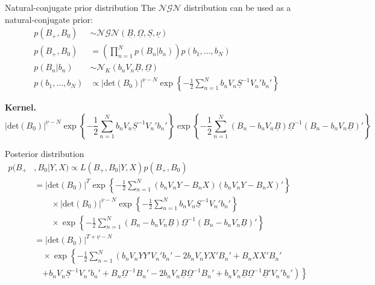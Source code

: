 \documentclass[notes,blackandwhite,mathsans,usenames,dvipsnames]{beamer}
\begin{document}
\begin{frame}{Natural-conjugate prior distribution}
\small
{\color{mcxs2}The} $\mathcal{NGN}$ {\color{mcxs2}distribution can be used as a natural-conjugate prior:}
\begin{align*}
p(B_+,B_0)&\sim\mathcal{NGN}\left( \underline{B}, \underline{\Omega}, \underline{S} , \underline{\nu}  \right)\\[2ex]
p(B_+,B_0)&= \left(\prod_{n=1}^{N}p(B_n|b_n)\right)p(b_1,\dots,b_N)\\[1ex]
p(B_n|b_n)&\sim\mathcal{N}_K\left( b_nV_n\underline{B}, \underline{\Omega} \right)\\
p(b_1,\dots,b_N)&\propto |\text{det}(B_0)|^{\underline{\nu}-N}\exp\left\{ -\frac{1}{2}\sum_{n=1}^N b_nV_n\underline{S}^{-1}V_n'b_n'\right\}
\end{align*}

\bigskip\textbf{Kernel.}\scriptsize
$$
|\text{det}(B_0)|^{\underline{\nu}-N}\exp\left\{ -\frac{1}{2}\sum_{n=1}^N b_nV_n\underline{S}^{-1}V_n'b_n'\right\}
\exp\left\{ -\frac{1}{2}\sum_{n=1}^N (B_n-b_nV_n\underline{B})\underline{\Omega}^{-1}(B_n-b_nV_n\underline{B})'\right\}
$$
\end{frame}





\begin{frame}{Posterior distribution}
\small
\begin{align*}
p(B_+&,B_0|Y,X)\propto L(B_+,B_0|Y,X)p(B_+,B_0)\\[2ex]
&= |\text{det}\left( B_0 \right)|^{T}\exp\left\{ -\frac{1}{2}\sum_{n=1}^N (b_nV_nY - B_n X)(b_nV_nY - B_n X)' \right\}\\
&\qquad\times |\text{det}(B_0)|^{\underline{\nu}-N} \exp\left\{ -\frac{1}{2}\sum_{n=1}^N b_nV_n\underline{S}^{-1}V_n'b_n'\right\}\\
&\qquad\times \exp\left\{ -\frac{1}{2}\sum_{n=1}^N (B_n-b_nV_n\underline{B})\underline{\Omega}^{-1}(B_n-b_nV_n\underline{B})'\right\}\\[2ex]
&= |\text{det}\left( B_0 \right)|^{T+\underline{\nu}-N}\\
&\quad\times\exp\left\{ -\frac{1}{2}\sum_{n=1}^N \left(
b_nV_nYY'V_n'b_n' -2 b_nV_nYX'B_n' + B_nXX'B_n' \right.\right.\\
&\quad \left.\left.+ b_nV_n\underline{S}^{-1}V_n'b_n' + 
B_n \underline{\Omega}^{-1} B_n' -2b_nV_n\underline{B}\underline{\Omega}^{-1}B_n' + 
b_nV_n\underline{B}\underline{\Omega}^{-1}\underline{B}'V_n'b_n'
\right) \right\}
\end{align*}

\end{frame}
\end{document}
